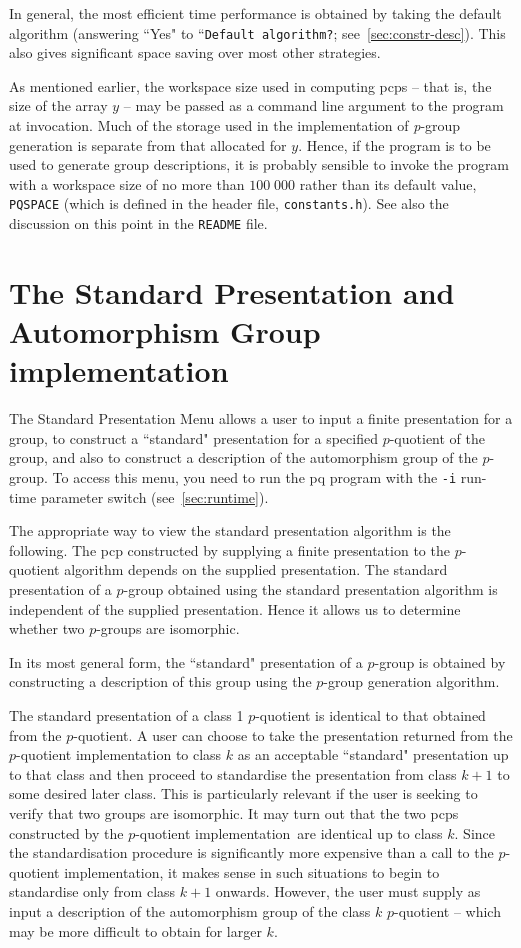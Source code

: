 \documentclass[12pt]{article}
\def\pq{the $p$-quotient implementation}
\begin{document}
In general, the most efficient time performance is obtained by 
taking the default algorithm (answering ``Yes" to 
``\texttt{Default algorithm?}; see~\ref{sec:constr-desc}). This also 
gives significant space saving over most other strategies. 

As mentioned earlier, the workspace size used in computing pcps -- 
that is, the size of the array $y$ -- may be passed as a command 
line argument to the program at invocation. Much of the storage used in the 
implementation of {\it p}-group generation is separate from that 
allocated for $y$. Hence, if the program is to be used to 
generate group descriptions, it is probably sensible 
to invoke the program with a workspace size of no more than 
$100\;000$ rather than its default value, \texttt{PQSPACE} 
(which is defined in the header file, \texttt{constants.h}).
See also the discussion on this point in the \texttt{README} file.

\section{The Standard Presentation and\\ Automorphism Group implementation}
\label{sec:stnd-pres-menu}
The Standard Presentation Menu allows a user 
to input a finite presentation for a group, to construct 
a ``standard" presentation for a specified $p$-quotient of the group,
and also to construct a description of the automorphism group of the $p$-group.
To access this menu, you need to run the pq program 
with the \texttt{-i} run-time parameter switch (see~\ref{sec:runtime}).

The appropriate way to view the standard presentation algorithm is the
following.
The pcp constructed by supplying a finite presentation to
the $p$-quotient algorithm depends on the supplied presentation.
The standard presentation of a $p$-group obtained using
the standard presentation algorithm is independent of the
supplied presentation. Hence it allows us to determine whether 
two $p$-groups are isomorphic.

In its most general form, the ``standard" presentation 
of a $p$-group is obtained by constructing a description of this
group using the $p$-group generation algorithm. 

The standard presentation of a class 1 $p$-quotient
is identical to that obtained from the $p$-quotient.
A user can choose to take the presentation returned
from the $p$-quotient implementation to class $k$ 
as an acceptable ``standard" presentation up to that 
class and then proceed to standardise the presentation 
from class $k + 1$ to some desired later class.
This is particularly relevant if the user is seeking
to verify that two groups are isomorphic.
It may turn out that the two pcps 
constructed by \pq\ are identical up to class $k$.
Since the standardisation procedure is significantly more
expensive than a call to \pq, it makes sense in such 
situations to begin to standardise only from class $k + 1$ onwards.
However, the user must supply as input a description
of the automorphism group of the class $k$ $p$-quotient
-- which may be more difficult to obtain for larger $k$.
\end{document}
